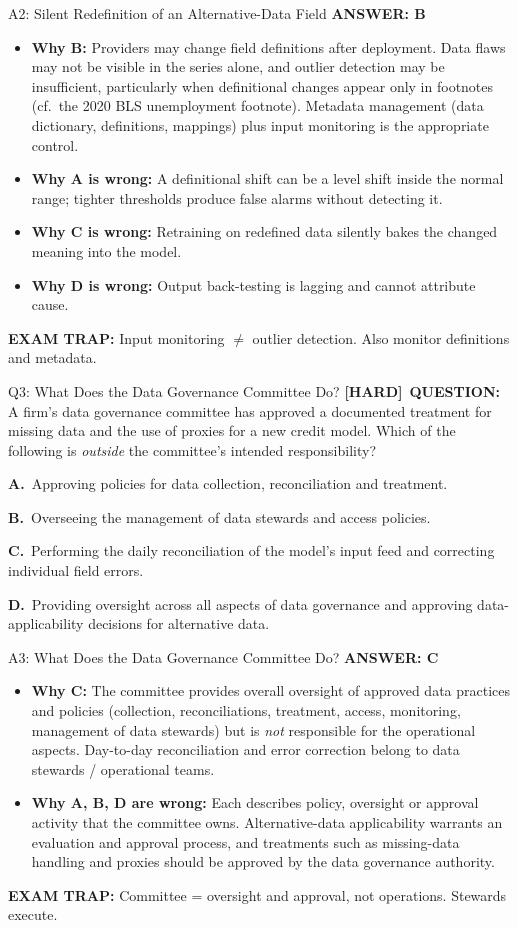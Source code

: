 \documentclass[8pt]{beamer}
\newcommand{\fs}{\fontsize{10}{12}\selectfont}
\newcommand{\opts}[4]{\par\vspace{0.12cm}\noindent\textbf{A.}~#1\par\vspace{0.08cm}\noindent\textbf{B.}~#2\par\vspace{0.08cm}\noindent\textbf{C.}~#3\par\vspace{0.08cm}\noindent\textbf{D.}~#4\par}
\newcommand{\ans}[1]{\textcolor{myblue}{\textbf{ANSWER: #1}}}
\newcommand{\trap}[1]{\textcolor{myred}{\textbf{EXAM TRAP:}} #1}
\newcommand{\hard}{\textcolor{myorange}{\textbf{[HARD]}}}
\begin{document}
\begin{frame}[t]{A2: Silent Redefinition of an Alternative-Data Field}
\fs
\ans{B}
\begin{itemize}
\item \textbf{Why B:} Providers may change field definitions after deployment. Data flaws may not be visible in the series alone, and outlier detection may be insufficient, particularly when definitional changes appear only in footnotes (cf.\ the 2020 BLS unemployment footnote). Metadata management (data dictionary, definitions, mappings) plus input monitoring is the appropriate control.
\item \textbf{Why A is wrong:} A definitional shift can be a level shift inside the normal range; tighter thresholds produce false alarms without detecting it.
\item \textbf{Why C is wrong:} Retraining on redefined data silently bakes the changed meaning into the model.
\item \textbf{Why D is wrong:} Output back-testing is lagging and cannot attribute cause.
\end{itemize}
\trap{Input monitoring $\neq$ outlier detection. Also monitor \textcolor{myblue}{definitions and metadata}.}
\end{frame}

\begin{frame}[t]{Q3: What Does the Data Governance Committee Do?}
\fs
\hard\ \textbf{QUESTION:} A firm's data governance committee has approved a documented treatment for missing data and the use of proxies for a new credit model. Which of the following is \emph{outside} the committee's intended responsibility?
\opts{Approving policies for data collection, reconciliation and treatment.}
{Overseeing the management of data stewards and access policies.}
{Performing the daily reconciliation of the model's input feed and correcting individual field errors.}
{Providing oversight across all aspects of data governance and approving data-applicability decisions for alternative data.}
\end{frame}

\begin{frame}[t]{A3: What Does the Data Governance Committee Do?}
\fs
\ans{C}
\begin{itemize}
\item \textbf{Why C:} The committee provides overall oversight of approved data practices and policies (collection, reconciliations, treatment, access, monitoring, management of data stewards) but is \emph{not} responsible for the operational aspects. Day-to-day reconciliation and error correction belong to data stewards / operational teams.
\item \textbf{Why A, B, D are wrong:} Each describes policy, oversight or approval activity that the committee owns. Alternative-data applicability warrants an evaluation and approval process, and treatments such as missing-data handling and proxies should be approved by the data governance authority.
\end{itemize}
\trap{Committee = \textcolor{myblue}{oversight and approval}, not operations. Stewards execute.}
\end{frame}
\end{document}
